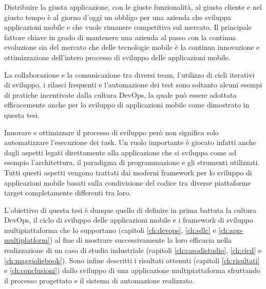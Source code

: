 
Distribuire la giusta applicazione, con le giuste funzionalità, al giusto cliente e nel giusto tempo è al giorno d'oggi un obbligo per una azienda che sviluppa applicazioni mobile e che vuole rimanere competitiva sul mercato. Il principale fattore chiave in grado di mantenere una azienda al passo con la continua evoluzione sia del mercato che delle tecnologie mobile è la continua innovazione e ottimizzazione dell'intero processo di sviluppo delle applicazioni mobile.

La collaborazione e la comunicazione tra diversi team, l'utilizzo di cicli iterativi di sviluppo, i rilasci frequenti e l'automazione dei test sono soltanto alcuni esempi di pratiche incentivate dalla cultura DevOps, la quale può essere adottata efficacemente anche per lo sviluppo di applicazioni mobile come dimostrato in questa tesi.

Innovare e ottimizzare il processo di sviluppo però non significa solo automatizzare l'esecuzione dei task. Un ruolo importante è giocato infatti anche dagli aspetti legati direttamente alla applicazione che si sviluppa come ad esempio l'architettura, il paradigma di programmazione e gli strumenti utilizzati. Tutti questi aspetti vengono trattati dai moderni framework per lo sviluppo di applicazioni mobile basati sulla condivisione del codice tra diverse piattaforme target completamente differenti tra loro.

L'obiettivo di questa tesi è dunque quello di definire in prima battuta la cultura DevOps, il ciclo di sviluppo delle applicazioni mobile e i framework di sviluppo multipiattaforma che lo supportano (capitoli \ref{ch:devops}, \ref{ch:sdlc} e \ref{ch:app-multiplatform}) al fine di mostrare successivamente la loro efficacia nella realizzazione di un caso di studio industriale (capitoli \ref{ch:casodistudio}, \ref{ch:cicd} e \ref{ch:maggioliebook}). Sono infine descritti i risultati ottenuti (capitoli \ref{ch:risultati} e \ref{ch:conclusioni}) dallo sviluppo di una applicazione multipiattaforma sfruttando il processo progettato e il sistema di automazione realizzato.
